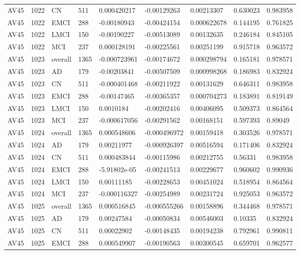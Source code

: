 \begin{landscape}
\begin{longtable}{lllllllll}
AV45 & 1022 & CN & 511 & 0.000420217 & -0.00129263 & 0.00213307 & 0.630023 & 0.983958 \\
AV45 & 1022 & EMCI & 288 & -0.00180943 & -0.00424154 & 0.000622678 & 0.144195 & 0.761825 \\
AV45 & 1022 & LMCI & 150 & -0.00190227 & -0.00513089 & 0.00132635 & 0.246184 & 0.845105 \\
AV45 & 1022 & MCI & 237 & 0.000128191 & -0.00225561 & 0.00251199 & 0.915718 & 0.963572 \\
AV45 & 1023 & overall & 1365 & -0.000723961 & -0.00174672 & 0.000298794 & 0.165181 & 0.978571 \\
AV45 & 1023 & AD & 179 & -0.00203841 & -0.00507509 & 0.000998268 & 0.186983 & 0.832924 \\
AV45 & 1023 & CN & 511 & -0.000401468 & -0.00211922 & 0.00131629 & 0.646311 & 0.983958 \\
AV45 & 1023 & EMCI & 288 & -0.00147465 & -0.00365357 & 0.000704273 & 0.183891 & 0.819149 \\
AV45 & 1023 & LMCI & 150 & 0.0010184 & -0.00202416 & 0.00406095 & 0.509373 & 0.864564 \\
AV45 & 1023 & MCI & 237 & -0.000617056 & -0.00291562 & 0.00168151 & 0.597393 & 0.89049 \\
AV45 & 1024 & overall & 1365 & 0.000548606 & -0.000496972 & 0.00159418 & 0.303526 & 0.978571 \\
AV45 & 1024 & AD & 179 & 0.00211977 & -0.000926397 & 0.00516594 & 0.171406 & 0.832924 \\
AV45 & 1024 & CN & 511 & 0.000483844 & -0.00115986 & 0.00212755 & 0.56331 & 0.983958 \\
AV45 & 1024 & EMCI & 288 & -5.91802e-05 & -0.00241513 & 0.00229677 & 0.960602 & 0.990936 \\
AV45 & 1024 & LMCI & 150 & 0.00111185 & -0.00228653 & 0.00451024 & 0.518954 & 0.864564 \\
AV45 & 1024 & MCI & 237 & -0.000116327 & -0.00254989 & 0.00231724 & 0.925053 & 0.963572 \\
AV45 & 1025 & overall & 1365 & 0.000516845 & -0.000555266 & 0.00158896 & 0.344468 & 0.978571 \\
AV45 & 1025 & AD & 179 & 0.00247584 & -0.00050834 & 0.00546003 & 0.10335 & 0.832924 \\
AV45 & 1025 & CN & 511 & 0.00022902 & -0.00148435 & 0.00194238 & 0.792961 & 0.990811 \\
AV45 & 1025 & EMCI & 288 & 0.000549907 & -0.00190563 & 0.00300545 & 0.659701 & 0.962577 \\

\end{longtable}
\end{landscape}
